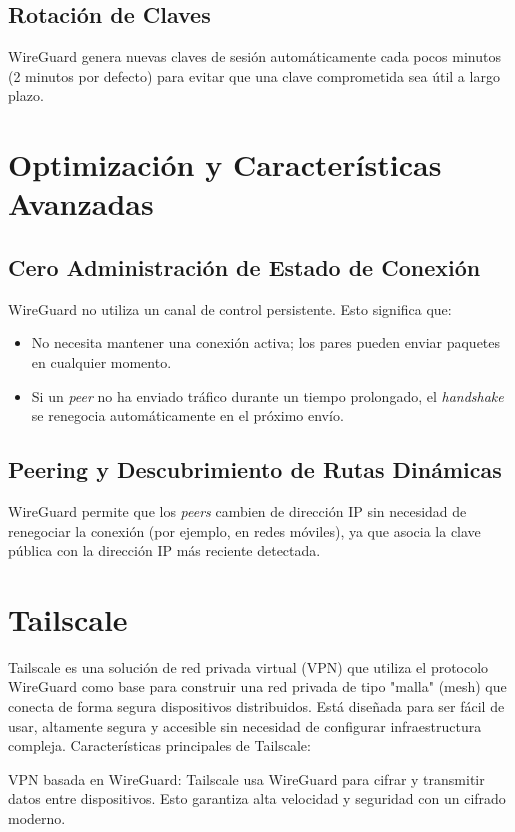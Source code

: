 \begin{enumerate}
\begin{enumerate}
   \subsection*{Rotación de Claves}
   WireGuard genera nuevas claves de sesión automáticamente cada pocos minutos (2 minutos por defecto) para evitar que una clave comprometida sea útil a largo plazo.
   
   \section*{Optimización y Características Avanzadas}
   
   \subsection*{Cero Administración de Estado de Conexión}
   WireGuard no utiliza un canal de control persistente. Esto significa que:
   \begin{itemize}
       \item No necesita mantener una conexión activa; los pares pueden enviar paquetes en cualquier momento.
       \item Si un \textit{peer} no ha enviado tráfico durante un tiempo prolongado, el \textit{handshake} se renegocia automáticamente en el próximo envío.
   \end{itemize}
   
   \subsection*{Peering y Descubrimiento de Rutas Dinámicas}
   WireGuard permite que los \textit{peers} cambien de dirección IP sin necesidad de renegociar la conexión (por ejemplo, en redes móviles), ya que asocia la clave pública con la dirección IP más reciente detectada.
   

\section{Tailscale}
Tailscale es una solución de red privada virtual (VPN) que utiliza el protocolo WireGuard como base para construir una red privada de tipo "malla" (mesh) que conecta de forma segura dispositivos distribuidos. Está diseñada para ser fácil de usar, altamente segura y accesible sin necesidad de configurar infraestructura compleja.
Características principales de Tailscale:

    VPN basada en WireGuard:
        Tailscale usa WireGuard para cifrar y transmitir datos entre dispositivos. Esto garantiza alta velocidad y seguridad con un cifrado moderno.


\end{enumerate}
\end{enumerate}
